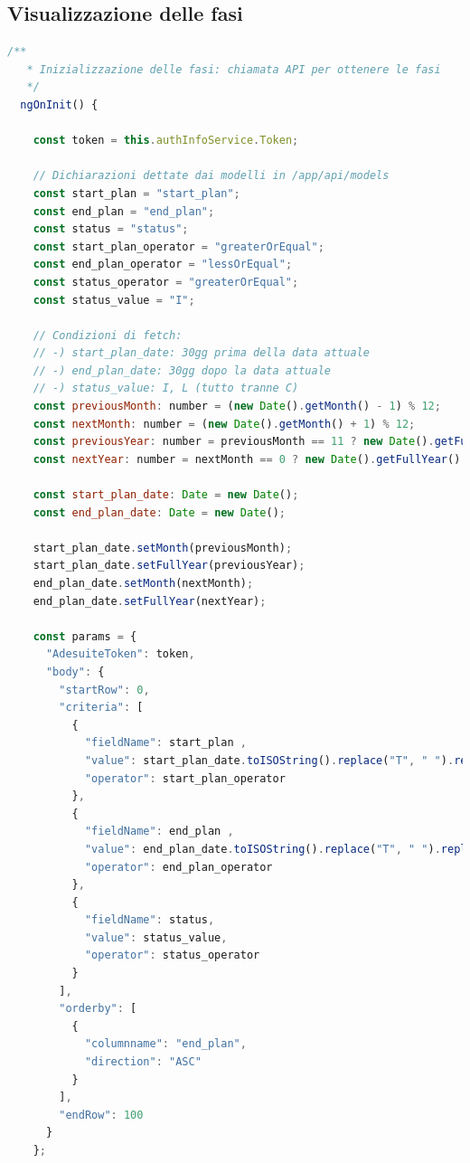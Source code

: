 \subsection*{Visualizzazione delle fasi}
\begin{lstlisting}[language=JavaScript, caption={Visualizzazione delle fasi - TypeScript}]
  /**
   * Inizializzazione delle fasi: chiamata API per ottenere le fasi
   */
  ngOnInit() {

    const token = this.authInfoService.Token;

    // Dichiarazioni dettate dai modelli in /app/api/models
    const start_plan = "start_plan";
    const end_plan = "end_plan";
    const status = "status";
    const start_plan_operator = "greaterOrEqual";
    const end_plan_operator = "lessOrEqual";
    const status_operator = "greaterOrEqual";
    const status_value = "I";

    // Condizioni di fetch:
    // -) start_plan_date: 30gg prima della data attuale
    // -) end_plan_date: 30gg dopo la data attuale
    // -) status_value: I, L (tutto tranne C)
    const previousMonth: number = (new Date().getMonth() - 1) % 12;
    const nextMonth: number = (new Date().getMonth() + 1) % 12;
    const previousYear: number = previousMonth == 11 ? new Date().getFullYear() - 1 : new Date().getFullYear();
    const nextYear: number = nextMonth == 0 ? new Date().getFullYear() + 1 : new Date().getFullYear();

    const start_plan_date: Date = new Date();
    const end_plan_date: Date = new Date();

    start_plan_date.setMonth(previousMonth);
    start_plan_date.setFullYear(previousYear);
    end_plan_date.setMonth(nextMonth);
    end_plan_date.setFullYear(nextYear);

    const params = {
      "AdesuiteToken": token,
      "body": {
        "startRow": 0,
        "criteria": [
          {
            "fieldName": start_plan ,
            "value": start_plan_date.toISOString().replace("T", " ").replace("Z", "").substring(0, 22),
            "operator": start_plan_operator
          },
          {
            "fieldName": end_plan ,
            "value": end_plan_date.toISOString().replace("T", " ").replace("Z", "").substring(0, 22),
            "operator": end_plan_operator
          },
          {
            "fieldName": status,
            "value": status_value,
            "operator": status_operator
          }
        ],
        "orderby": [
          {
            "columnname": "end_plan",
            "direction": "ASC"
          }
        ],
        "endRow": 100
      }
    };


\end{lstlisting}
